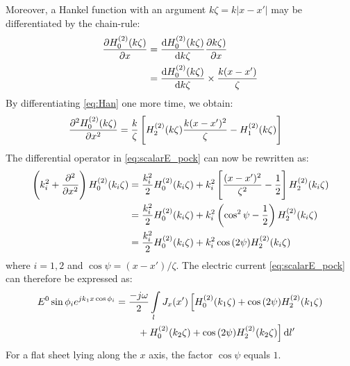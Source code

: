 \documentclass[11pt]{article}
\renewcommand{\O}{\omega}  %
\newcommand{\x}{\times}  %
\renewcommand{\^}{\hat}  %
\newcommand*\diff{\mathop{}\!\mathrm{d}} %
\begin{document}
%
Moreover, a Hankel function with an argument $ k \zeta = k |x - x'|$ may be differentiated by the chain-rule:
%
\begin{equation}
  \begin{split}
    \pdv{H_0^{(2)}(k \zeta)}{x} &= \dv{H_0^{(2)}(k \zeta)}{k \zeta} \pdv{k \zeta)}{x} \\
    &= \dv{H_0^{(2)}(k \zeta)}{k \zeta} \x \frac{k (x - x')}{\zeta}
  \end{split}
  \label{eq:Han}
\end{equation}
%
By differentiating \eqref{eq:Han} one more time, we obtain:
%
\begin{align}
  \pdv[2]{H_0^{(2)}(k \zeta)}{x} &= \frac{k}{\zeta} \left[H_2^{(2)}(k \zeta) \frac{k (x - x')^2}{\zeta} - H_1^{(2)}(k \zeta) \right]
  \label{eq:difHan}
\end{align}
%
The differential operator in \eqref{eq:scalarE_pock} can now be rewritten as:
%
\begin{equation}
  \begin{split}
    \left(k_i^2 + \pdv[2]{}{x} \right) H_0^{(2)}(k_i \zeta) &= \frac{k_i^2}{2} H_0^{(2)}(k_i \zeta) + k_i^2 \left[ \frac{(x-x')^2}{\zeta^2} - \frac{1}{2} \right] H_2^{(2)}(k_i \zeta) \\
    &= \frac{k_i^2}{2} H_0^{(2)}(k_i \zeta) + k_i^2 \left( \cos^2 \psi - \frac{1}{2} \right) H_2^{(2)}(k_i \zeta) \\
    &= \frac{k_i^2}{2} H_0^{(2)}(k_i \zeta) + k_i^2 \cos {(2\psi)} H_2^{(2)}(k_i \zeta)
  \end{split}
  \label{eq:Hankel_final}
\end{equation}
%
where $i = 1,2$ and $ \cos \psi = {(x-x')/\zeta}$. The electric current \eqref{eq:scalarE_pock} can therefore be expressed as:
%
\begin{align}
  E^0 \sin \phi_i  e^{j k_1 x \cos \phi_i} &=  \frac{-j \O}{2} \int\limits_{l} J_x(x') \left[ H_0^{(2)}(k_1 \zeta) + \cos {(2 \psi)} H_2^{(2)}(k_1 \zeta) \right. \notag\\
  &\qquad \left. {} + H_0^{(2)}(k_2 \zeta) + \cos {(2\psi)} H_2^{(2)}(k_2 \zeta)\right]\diff{l'}
  \label{eq:J_final}
\end{align}
%
For a flat sheet lying along the $x$ axis, the factor $\cos \psi$ equals $1$.
%
%
%
\end{document}
